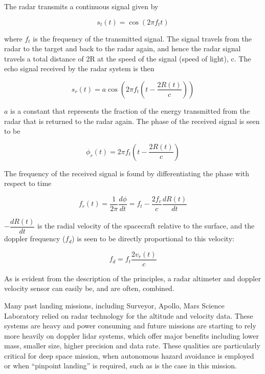 The radar transmits a continuous signal given by

\begin{equation}
s_t(t)=\cos (2 \pi f_t t)
\end{equation}


where $f_t$ is the frequency of the transmitted signal. The signal travels
from the radar to the target and back to the radar again, and hence the radar signal
travels a total distance of 2R at the speed of the signal (speed of light), c. The echo signal received by the radar
system is then

\begin{equation}
s_r(t)=a \cos(2 \pi f_t(t-\dfrac{2R(t)}{c}))
\end{equation}

$a$ is a constant that represents the fraction of the energy transmitted from the radar
that is returned to the radar again. The phase of the received signal is seen to be 

\begin{equation}
\phi_r(t)=2 \pi f_t(t-\dfrac{2R(t)}{c})
\end{equation}


The frequency of the received signal is found by differentiating the phase with respect
to time

\begin{equation}
f_r(t)=\dfrac{1}{2 \pi}\dfrac{d\phi}{dt} = f_t - \dfrac{2 f_c}{c}\dfrac{dR(t)}{dt}
\end{equation}

$-\dfrac{dR(t)}{dt}$ is the radial velocity of the spacecraft relative to the surface, and the doppler frequency ($f_d$) is seen to be directly proportional to this velocity:

\begin{equation}
f_d= f_t\dfrac{2 v_r(t)}{c}
\end{equation}

As is evident from the description of the principles, a radar altimeter and doppler velocity sensor can easily be, and are often, combined. 

Many past landing missions, including Surveyor, Apollo, Mars Science Laboratory relied on radar
technology for the altitude and velocity data. These systems are heavy and power consuming and future missions are starting to rely more heavily on doppler lidar systems, which offer major benefits including lower mass, smaller
size, higher precision and data rate. These qualities are particularly critical for deep space mission, when autonomous hazard avoidance is employed or when “pinpoint landing” is required, such as is the case in this mission.



